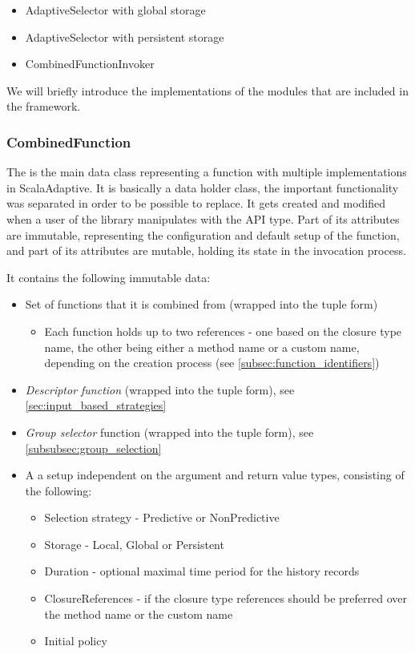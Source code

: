 \begin{itemize}
	\item AdaptiveSelector with global storage
	\item AdaptiveSelector with persistent storage
	\item CombinedFunctionInvoker
\end{itemize}

We will briefly introduce the implementations of the modules that are included in the framework.

\subsubsection{CombinedFunction}

The  is the main data class representing a function with multiple implementations in ScalaAdaptive. It is basically a data holder class, the important functionality was separated in order to be possible to replace. It gets created and modified when a user of the library manipulates with the  API type. Part of its attributes are immutable, representing the configuration and default setup of the function, and part of its attributes are mutable, holding its state in the invocation process.

It contains the following immutable data:

\begin{itemize}
	\item Set of functions that it is combined from (wrapped into the tuple form)
	\begin{itemize}
		\item	Each function holds up to two references - one based on the closure type name, the other being either a method name or a custom name, depending on the creation process (see \ref{subsec:function_identifiers})
	\end{itemize}
	\item \textit{Descriptor function} (wrapped into the tuple form), see \ref{sec:input_based_strategies}
	\item \textit{Group selector} function (wrapped into the tuple form), see \ref{subsubsec:group_selection}
	\item A  a setup independent on the argument and return value types, consisting of the following:
	\begin{itemize}
		\item Selection strategy - Predictive or NonPredictive
		\item Storage - Local, Global or Persistent
		\item Duration - optional maximal time period for the history records
		\item ClosureReferences - if the closure type references should be preferred over the method name or the custom name
		\item Initial policy
	\end{itemize}
\end{itemize}

